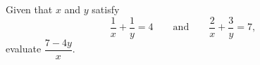 Given that $x$ and $y$ satisfy
\[\dfrac1x+\dfrac1y=4\qquad\text{and}\qquad\dfrac2x+\dfrac3y=7,\]
evaluate $\dfrac{7-4y}{x}$.
